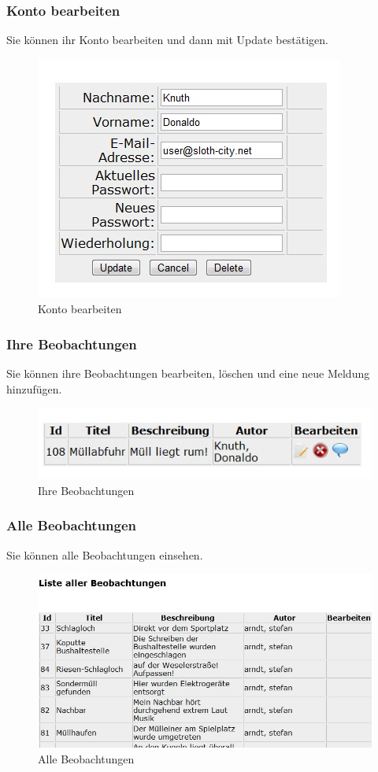 \documentclass[a4paper,11pt]{scrartcl}
\begin{document}
\subsubsection{Konto bearbeiten}
Sie können ihr Konto bearbeiten und dann mit Update bestätigen.
\begin{figure}[h]
\centering
\includegraphics[width = 10 cm]{img/kontobearbeiten}
\caption{Konto bearbeiten}
\label{kontobearbeiten}
\end{figure}

\subsubsection{Ihre Beobachtungen}
Sie können ihre Beobachtungen bearbeiten, löschen und eine neue Meldung hinzufügen.
\begin{figure}[h]
\centering
\includegraphics[width = 10 cm]{img/ihrebeobachtungen}
\caption{Ihre Beobachtungen}
\label{Ihre Beobachtungen}
\end{figure}

\subsubsection{Alle Beobachtungen}
Sie können alle Beobachtungen einsehen.
\begin{figure}[h]
\centering
\includegraphics[width = 10 cm]{img/allebeobachtungen}
\caption{Alle Beobachtungen}
\label{Alle Beobachtungen}
\end{figure}
\end{document}
